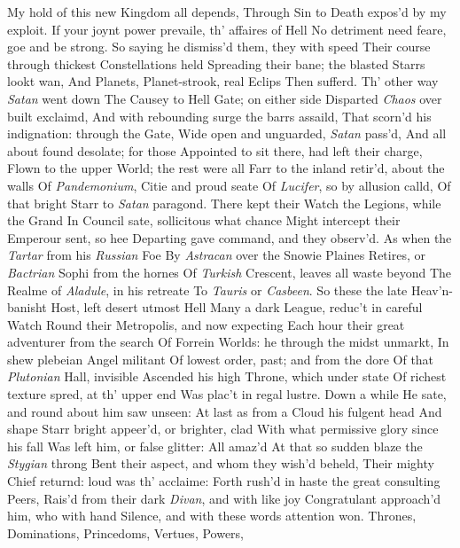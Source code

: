 \documentclass[11pt]{book}
\newcounter {last}
\begin{document}
My hold of this new Kingdom all depends, 
Through Sin to Death expos'd by my exploit. 
If your joynt power prevaile, th' affaires of Hell 
No detriment need feare, goe and be strong. 
\quad So saying he dismiss'd them, they with speed 
Their course through thickest Constellations held 
Spreading their bane; the blasted Starrs lookt wan, 
And Planets, Planet-strook, real Eclips 
Then sufferd.  Th' other way \textit{Satan} went down 
The Causey to Hell Gate; on either side 
Disparted \textit{Chaos} over built exclaimd, 
And with rebounding surge the barrs assaild, 
That scorn'd his indignation: through the Gate, 
Wide open and unguarded, \textit{Satan} pass'd, 
And all about found desolate; for those 
Appointed to sit there, had left their charge, 
Flown to the upper World; the rest were all 
Farr to the inland retir'd, about the walls 
Of \textit{Pandemonium}, Citie and proud seate 
Of \textit{Lucifer}, so by allusion calld, 
Of that bright Starr to \textit{Satan} paragond. 
There kept their Watch the Legions, while the Grand 
In Council sate, sollicitous what chance 
Might intercept their Emperour sent, so hee 
Departing gave command, and they observ'd. 
As when the \textit{Tartar} from his \textit{Russian} Foe 
By \textit{Astracan} over the Snowie Plaines 
Retires, or \textit{Bactrian} Sophi from the hornes 
Of \textit{Turkish} Crescent, leaves all waste beyond 
The Realme of \textit{Aladule}, in his retreate 
To \textit{Tauris} or \textit{Casbeen}.  So these the late 
Heav'n-banisht Host, left desert utmost Hell 
Many a dark League, reduc't in careful Watch 
Round their Metropolis, and now expecting 
Each hour their great adventurer from the search 
Of Forrein Worlds: he through the midst unmarkt, 
In shew plebeian Angel militant 
Of lowest order, past; and from the dore 
Of that \textit{Plutonian} Hall, invisible 
Ascended his high Throne, which under state 
Of richest texture spred, at th' upper end 
Was plac't in regal lustre.  Down a while 
He sate, and round about him saw unseen: 
At last as from a Cloud his fulgent head 
And shape Starr bright appeer'd, or brighter, clad 
With what permissive glory since his fall 
Was left him, or false glitter: All amaz'd 
At that so sudden blaze the \textit{Stygian} throng 
Bent their aspect, and whom they wish'd beheld, 
Their mighty Chief returnd: loud was th' acclaime: 
Forth rush'd in haste the great consulting Peers, 
Rais'd from their dark \textit{Divan}, and with like joy 
Congratulant approach'd him, who with hand 
Silence, and with these words attention won. 
\quad Thrones, Dominations, Princedoms, Vertues, Powers, 
\end{document}

